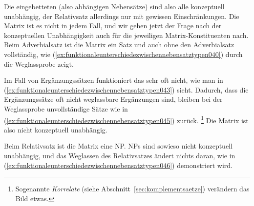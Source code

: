Die eingebetteten (also abhängigen Nebensätze) sind also alle konzeptuell unabhängig, der Relativsatz allerdings nur mit gewissen Einschränkungen.
Die Matrix ist es nicht in jedem Fall, und wir gehen jetzt der Frage nach der konzeptuellen Unabhängigkeit auch für die jeweiligen Matrix-Konstituenten nach.
Beim Adverbialsatz ist die Matrix ein Satz und auch ohne den Adverbialsatz vollständig, wie (\ref{ex:funktionaleunterschiedezwischennebensatztypen040}) durch die Weglassprobe zeigt.

\begin{exe}
  \ex\label{ex:funktionaleunterschiedezwischennebensatztypen040}
    \begin{xlist}
    \end{xlist}
\end{exe}

Im Fall von Ergänzungssätzen funktioniert das sehr oft nicht, wie man in (\ref{ex:funktionaleunterschiedezwischennebensatztypen043}) sieht.
Dadurch, dass die Ergänzungssätze oft nicht weglassbare Ergänzungen sind, bleiben bei der Weglassprobe unvollständige Sätze wie in (\ref{ex:funktionaleunterschiedezwischennebensatztypen045}) zurück.%
\footnote{Sogenannte \textit{Korrelate} (siehe Abschnitt~\ref{sec:komplementsaetze}) verändern das Bild etwas.}
Die Matrix ist also nicht konzeptuell unabhängig.

\begin{exe}
    \ex\label{ex:funktionaleunterschiedezwischennebensatztypen043}
    \begin{xlist}
    \end{xlist}
\end{exe}

Beim Relativsatz ist die Matrix eine NP.
NPs sind sowieso nicht konzeptuell unabhängig, und das Weglassen des Relativsatzes ändert nichts daran, wie in (\ref{ex:funktionaleunterschiedezwischennebensatztypen046}) demonstriert wird.


\begin{exe}
  \ex\label{ex:funktionaleunterschiedezwischennebensatztypen046}
    \begin{xlist}
    \end{xlist}
\end{exe}

